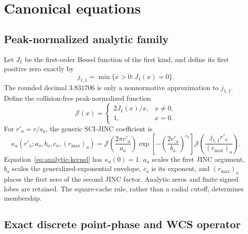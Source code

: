 \section{Canonical equations}
\label{sec:equations}

\subsection{Peak-normalized analytic family}
\label{sec:analytic-family}

Let $J_1$ be the first-order Bessel function of the first kind, and define its
first positive zero exactly by
\begin{equation}
  j_{1,1}=\min\{x>0:J_1(x)=0\}.
  \label{eq:first-bessel-root}
\end{equation}
The rounded decimal $3.831706$ is only a nonnormative approximation to
$j_{1,1}$.  Define the collision-free peak-normalized function
\begin{equation}
  \mathcal{J}(x)=
  \begin{cases}
    2J_1(x)/x, & x\ne0,\\
    1, & x=0.
  \end{cases}
  \label{eq:peak-jinc}
\end{equation}
For $r'_a=r/s_a$, the generic SCI-JINC coefficient is
\begin{equation}
  \kappa_a(r'_a; a_a,b_a,c_a,(r_{\max})_a)
  =\mathcal{J}\!\left(\frac{2\pi r'_a}{a_a}\right)
   \exp\!\left[-\left(\frac{2r'_a}{b_a}\right)^{c_a}\right]
   \mathcal{J}\!\left(\frac{j_{1,1}r'_a}{(r_{\max})_a}\right).
  \label{eq:analytic-kernel}
\end{equation}
Equation~\eqref{eq:analytic-kernel} has $\kappa_a(0)=1$.
$a_a$ scales the first JINC argument, $b_a$ scales the generalized-exponential
envelope, $c_a$ is its exponent, and $(r_{\max})_a$ places the first zero of
the second JINC factor.  Analytic zeros and finite signed lobes are retained.
The square-cache rule, rather than a radial cutoff, determines membership.

\subsection{Exact discrete point-phase and WCS operator}
\label{sec:discrete-operator}


